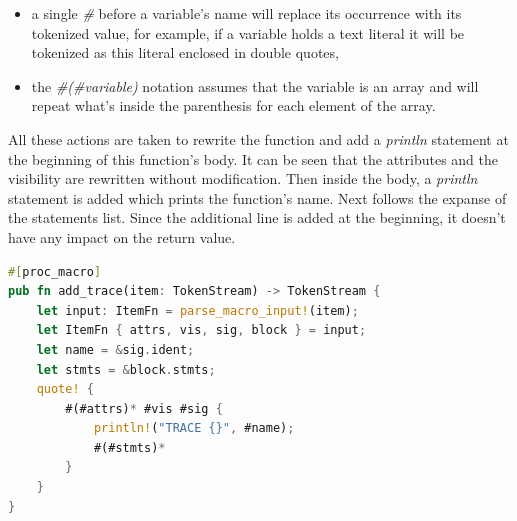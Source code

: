 \begin{itemize}
    \item a single \textit{\#} before a variable's name will replace its occurrence with its tokenized value, for example, if a variable holds a text literal it will be tokenized as this literal enclosed in double quotes,
    \item the \textit{\#(\#variable)\*} notation assumes that the variable is an array and will repeat what's inside the parenthesis for each element of the array.
\end{itemize}
All these actions are taken to rewrite the function and add a \textit{println} statement at the beginning of this function's body. It can be seen that the attributes and the visibility are rewritten without modification. Then inside the body, a \textit{println} statement is added which prints the function's name. Next follows the expanse of the statements list. Since the additional line is added at the beginning, it doesn't have any impact on the return value.


\begin{minipage}{.9\textwidth}
    \begin{lstlisting}[language=rust,caption={A procedural macro example.},captionpos=b,label={proc_macro}]
#[proc_macro]
pub fn add_trace(item: TokenStream) -> TokenStream {
    let input: ItemFn = parse_macro_input!(item);
    let ItemFn { attrs, vis, sig, block } = input;
    let name = &sig.ident;
    let stmts = &block.stmts;
    quote! {
        #(#attrs)* #vis #sig {
            println!("TRACE {}", #name);
            #(#stmts)*
        }
    }
}
    \end{lstlisting}
\end{minipage}

